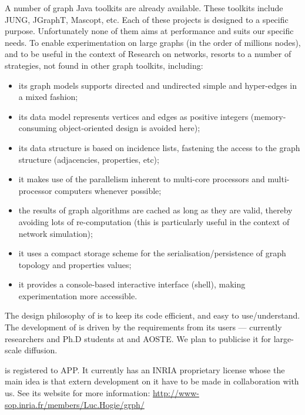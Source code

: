 \documentclass{article}
\begin{document}
A number of graph Java toolkits are already available. These
toolkits include JUNG, JGraphT, Mascopt, etc. Each of these projects is designed
to a specific purpose. Unfortunately none of them aims at performance and suits our specific needs.
To enable experimentation on large graphs (in
the order of millions nodes), and to be useful in the context of \coati Research on networks, \grph resorts to a number of strategies, not found in other graph toolkits, including:
\begin{itemize}
\item  its graph models supports directed and
undirected simple and hyper-edges in a mixed fashion;
\item its
data model  represents vertices and edges as positive integers (memory-consuming object-oriented design is avoided here);
\item its 
 data structure is based on incidence lists, fastening the access to the graph structure (adjacencies,
properties, etc);
\item it makes use of the parallelism inherent to multi-core processors and multi-processor computers whenever possible;
\item the results of graph algorithms are cached as long as they are valid, thereby avoiding lots of re-computation (this is particularly useful in the context of network simulation);
\item it uses a compact storage scheme for the serialisation/persistence of graph topology and properties values;
\item it provides a console-based interactive interface (shell), making experimentation more accessible.
\end{itemize}

The design philosophy of \grph is to keep its code efficient, and easy to use/understand. 
The development of \grph is driven by the requirements from its users --- currently researchers and Ph.D students at \coati and AOSTE.
We plan to publicise it for large-scale diffusion. 

 \grph is registered to APP. It currently has an INRIA proprietary license whose the main idea is that extern development on it have
 to be made in collaboration with us. See its website for more information:
 \url{http://www-sop.inria.fr/members/Luc.Hogie/grph/}



%




\end{document}
